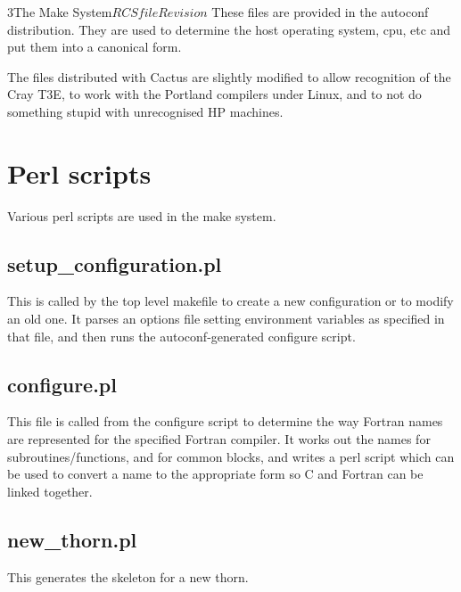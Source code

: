 \begin{cactuspart}{3}{The Make System}{$RCSfile$}{$Revision$}
These files are provided in the autoconf distribution.  They are used to
determine the host operating system, cpu, etc and put them into a
canonical form.

The files distributed with Cactus are slightly modified to allow recognition
of the Cray T3E, to work with the Portland compilers under Linux, and to
not do something stupid with unrecognised HP machines.

\chapter{Perl scripts}
\label{ch:perlscripts}

Various perl scripts are used in the make system.

\section{setup\_configuration.pl}
\label{sec:perlscripts:setup}

This is called by the top level makefile to create a new configuration or
to modify an old one.  It parses an options file setting environment 
variables as specified in that file, and then runs the autoconf-generated
configure script.

\section{configure.pl}
\label{sec:perlscripts:configure}

This file is called from the configure script to determine the way Fortran
names are represented for the specified Fortran compiler.  It works out the
names for subroutines/functions, and for common blocks, and writes a
perl script which can be used to convert a name to the appropriate form so
C and Fortran can be linked together.

\section{new\_thorn.pl}
\label{sec:perlscripts:newthorn}

This generates the skeleton for a new thorn.

\end{cactuspart}
